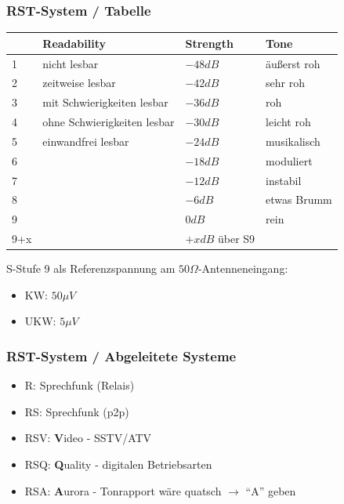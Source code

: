 \begin{frame}
    \frametitle{RST-System / Tabelle}

    \begin{center}
    \footnotesize
    \begin{tabular}{|l|l|l|l|}\hline
          & \textbf{R}eadability        & \textbf{S}trength & \textbf{T}one \\ \hline \hline
        1 & nicht lesbar                & $-48 dB$          & äußerst roh   \\ \hline
        2 & zeitweise lesbar            & $-42 dB$          & sehr roh      \\ \hline
        3 & mit Schwierigkeiten lesbar  & $-36 dB$          & roh           \\ \hline
        4 & ohne Schwierigkeiten lesbar & $-30 dB$          & leicht roh    \\ \hline
        5 & einwandfrei lesbar          & $-24 dB$          & musikalisch   \\ \hline
        6 &                             & $-18 dB$          & moduliert     \\ \hline
        7 &                             & $-12 dB$          & instabil      \\ \hline
        8 &                             & $-6 dB$           & etwas Brumm   \\ \hline
        9 &                             & $0dB$             & rein          \\ \hline
        9+x &                           & $+x dB$ über S9   &               \\ \hline
    \end{tabular}
    \end{center}

    S-Stufe 9 als Referenzspannung am $50 \Omega$-Antenneneingang:
    \begin{itemize}
        \item KW: $50\mu V$
        \item UKW: $5\mu V$
    \end{itemize}

\end{frame}

\begin{frame}
    \frametitle{RST-System / Abgeleitete Systeme}

    \begin{itemize}
        \item R: Sprechfunk (Relais)
        \item RS: Sprechfunk (p2p)
        \item RSV: \textbf{V}ideo - SSTV/ATV
        \item RSQ: \textbf{Q}uality - digitalen Betriebsarten
        \item RSA: \textbf{A}urora - Tonrapport wäre quatsch $\rightarrow$ ``A'' geben
    \end{itemize}

\end{frame}

